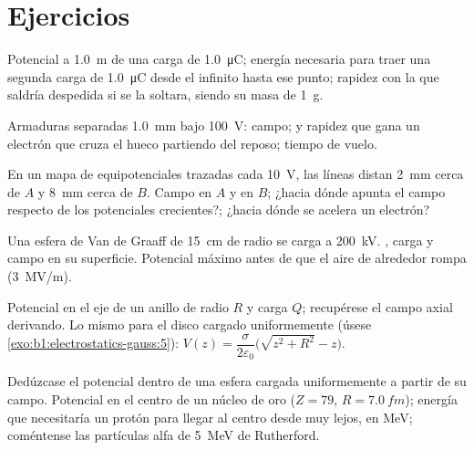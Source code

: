 \section{Ejercicios}

\begin{exercise}[$\star$]\label{exo:b1:potential-capacitors:1}
Potencial a \qty{1.0}{m} de una carga de \qty{1.0}{\micro C}; energía
necesaria para traer una segunda carga de \qty{1.0}{\micro C} desde el
infinito hasta ese punto; rapidez con la que saldría despedida si se la
soltara, siendo su masa de \qty{1}{g}.
\end{exercise}

\begin{exercise}[$\star$]\label{exo:b1:potential-capacitors:2}
Armaduras separadas \qty{1.0}{mm} bajo \qty{100}{V}: campo;  y rapidez que gana un electrón que cruza el hueco partiendo del
reposo; tiempo de vuelo.
\end{exercise}

\begin{exercise}[$\star$]\label{exo:b1:potential-capacitors:3}
En un mapa de equipotenciales trazadas cada \qty{10}{V}, las líneas
distan \qty{2}{mm} cerca de $A$ y \qty{8}{mm} cerca de $B$. Campo en $A$ y
en $B$; ¿hacia dónde apunta el campo respecto de los potenciales
crecientes?; ¿hacia dónde se acelera un electrón?
\end{exercise}

\begin{exercise}[$\star$]\label{exo:b1:potential-capacitors:4}
Una esfera de Van de Graaff de \qty{15}{cm} de radio se carga a \qty{200}{kV}.
, carga y campo en su superficie. Potencial máximo antes de que
el aire de alrededor rompa (\qty{3}{MV/m}).
\end{exercise}

\begin{exercise}[$\star\star$]\label{exo:b1:potential-capacitors:5}
Potencial en el eje de un anillo de radio $R$ y carga $Q$; recupérese el
campo axial derivando. Lo mismo para el disco cargado uniformemente
(úsese \cref{exo:b1:electrostatics-gauss:5}): $V(z) = \dfrac{\sigma}{2\varepsilon_0}
\bigl(\sqrt{z^2 + R^2} - z\bigr)$.
\end{exercise}

\begin{exercise}[$\star\star$]\label{exo:b1:potential-capacitors:6}
Dedúzcase el potencial dentro de una esfera cargada uniformemente a
partir de su campo. Potencial en el centro de un núcleo de oro ($Z = 79$,
$R = \qty{7.0}{fm}$); energía que necesitaría un protón para llegar al
centro desde muy lejos, en \unit{MeV}; coméntense las partículas alfa de
\qty{5}{MeV} de Rutherford.
\end{exercise}

